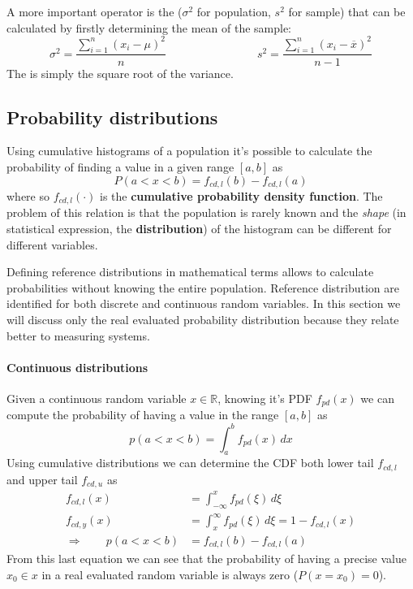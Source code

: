 	A more important operator is the  ($\sigma^2$ for population, $s^2$ for sample) that can be calculated by firstly determining the mean of the sample:
	\begin{equation}
		\sigma^2 = \frac{\sum_{i=1}^n (x_i-\mu)^2 }{n} \qquad \qquad \qquad \qquad s^2 = \frac{\sum_{i=1}^n (x_i-\overline x)^2 }{n-1}
	\end{equation}
	The  is simply the square root of the variance.
	
\subsection{Probability distributions}
	Using cumulative histograms of a population it's possible to calculate the probability of finding a value in a given range $[a,b]$ as
	\[ P(a<x<b) = f_{cd,l}(b)-f_{cd,l}(a) \]
	where so $f_{cd,l}(\cdot)$ is the \textbf{cumulative probability density function}. The problem of this relation is that the population is rarely known and the \textit{shape} (in statistical expression, the \textbf{distribution}) of the histogram can be different for different variables.
	
	Defining reference distributions in mathematical terms allows to calculate probabilities without knowing the entire population. Reference distribution are identified for both discrete and continuous random variables. In this section we will discuss only the real evaluated probability distribution because they relate better to measuring systems.
	
	\paragraph{Continuous distributions} Given a continuous random variable $x\in\mathds R$, knowing it's  PDF $f_{pd}(x)$ we can compute the probability of having a value in the range $[a,b]$ as
	\begin{equation}
		p(a<x<b) = \int_a^b f_{pd}(x)\, dx
	\end{equation}
	Using cumulative distributions we can determine the  CDF both lower tail $f_{cd,l}$ and upper tail $f_{cd,u}$ as
	\begin{equation}
	\begin{aligned}
		f_{cd,l}(x) & = \int_{-\infty}^x f_{pd}(\xi)\, d\xi \\
		f_{cd,y}(x) & = \int_x^\infty f_{pd}(\xi)\, d\xi = 1 - f_{cd,l}(x) \\
		\Rightarrow \qquad p(a<x<b) &= f_{cd,l}(b)-f_{cd,l}(a)
	\end{aligned}
	\end{equation}
	From this last equation we can see that the probability of having a precise value $x_0\in x$ in a real  evaluated random variable is always zero ($P(x=x_0) = 0$).
	
